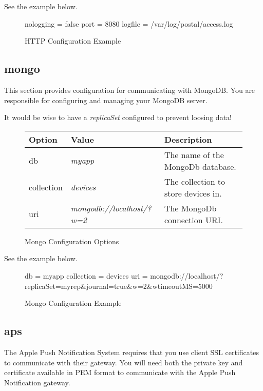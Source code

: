 \documentclass[12pt]{article}
\begin{document}
See the example below.

\begin{figure}[h!]
\begin{Terminal}
[http]
nologging = false
port = 8080
logfile = /var/log/postal/access.log
\end{Terminal}
\caption{HTTP Configuration Example}
\end{figure}

\subsection{mongo}

This section provides configuration for communicating with MongoDB.
You are responsible for configuring and managing your MongoDB server.

It would be wise to have a \emph{replicaSet} configured to prevent loosing data!

\begin{figure}[h!]
\centering
\begin{tabular}{l l l}
\hline
Option & Value & Description \\
\hline
db & \emph{myapp} & The name of the MongoDb database. \\
collection & \emph{devices} & The collection to store devices in. \\
uri & \emph{\small mongodb://localhost/?w=2} & The MongoDb connection URI. \\
\hline
\end{tabular}
\caption{Mongo Configuration Options}
\end{figure}

See the example below.

\begin{figure}[h!]
\begin{Terminal}
[mongo]
db = myapp
collection = devices
uri = mongodb://localhost/?replicaSet=myrep&journal=true&w=2&wtimeoutMS=5000
\end{Terminal}
\caption{Mongo Configuration Example}
\end{figure}

\subsection{aps}

The Apple Push Notification System requires that you use client SSL certificates to communicate with their gateway.
You will need both the private key and certificate available in PEM format to communicate with the Apple Push Notification gateway.
\end{document}
